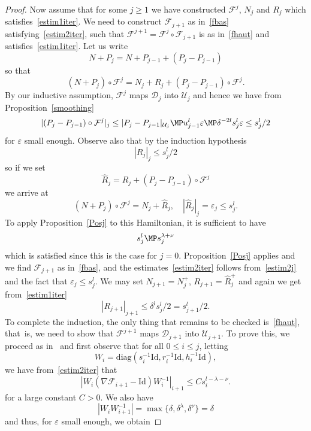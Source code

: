 \begin{proof}
Now assume that for some $j \geq 1$ we have constructed $\mathcal{F}^j$, $N_{j}$ and $R_{j}$ which satisfies~\eqref{estim1iter}. We need to construct $\mathcal{F}_{j+1}$ as in~\eqref{fbas} satisfying~\eqref{estim2iter}, such that $\mathcal{F}^{j+1}=\mathcal{F}^j \circ \mathcal{F}_{j+1}$ is as in~\eqref{fhaut} and satisfies~\eqref{estim1iter}. Let us write
\[ N+P_{j}=N+P_{j-1} +(P_{j} -P_{j-1}) \]
so that
\[ (N+P_{j})\circ \mathcal{F}^j=N_j+R_j+(P_{j} -P_{j-1}) \circ \mathcal{F}^j .\]
By our inductive assumption, $\mathcal{F}^j$ maps $\mathcal{D}_{j}$ into $\mathcal{U}_j$ and hence we have from Proposition~\ref{smoothing}
\[|(P_{j}-P_{j-1}) \circ\mathcal{F}^j|_{j} \leq |P_{j}-P_{j-1}|_{\mathcal{U}_j} \MP u_{j-1}^l\varepsilon \MP \delta^{-2l}s_j^l\varepsilon \leq s_j^l/2 \]
for $\varepsilon$ small enough. Observe also that by the induction hypothesis
\[ |R_{j}|_{j} \leq s_{j}^l/2 \]
so if we set
\[ \hat{R}_j=R_j+(P_{j} -P_{j-1}) \circ \mathcal{F}^j \]
we arrive at
\[ (N+P_{j})\circ \mathcal{F}^j=N_j+\hat{R}_j, \quad |\hat{R}_j|_{j}=\varepsilon_j \leq s_j^l. \]
To apply Proposition~\ref{Posj} to this Hamiltonian, it is sufficient to have
\begin{equation*}
s_j^l \MP s_j^{\lambda+\nu}
\end{equation*}
which is satisfied since this is the case for $j=0$. Proposition~\ref{Posj} applies and we find $\mathcal{F}_{j+1}$ as in~\eqref{fbas}, and the estimates~\eqref{estim2iter} follows from~\eqref{estim2j} and the fact that $\varepsilon_j\leq s_j^l$. We may set $N_{j+1}=N_j^+$, $R_{j+1}=\hat{R}_j^+$ and again we get from~\eqref{estim1iter}
\[ |R_{j+1}|_{j+1} \leq \delta^ls_j^l/2= s_{j+1}^l/2. \]
To complete the induction, the only thing that remains to be checked is~\eqref{fhaut}, that~is, we need to show that $\mathcal{F}^{j+1}$ maps $\mathcal{D}_{j+1}$ into $\mathcal{U}_{j+1}$. To prove this, we proceed as in~\cite{Pop04} and first observe that for all $0 \leq i \leq j$, letting
\[
W_i=\mathrm{diag}(s_i^{-1}\mathrm{Id},r_i^{-1}\mathrm{Id},h_i^{-1}\mathrm{Id}),
\]
we have from~\eqref{estim2iter} that
\begin{equation}\label{estweight1}
|W_i(\nabla \mathcal{F}_{i+1}-\mathrm{Id})W_i^{-1}|_{i+1} \leq C s_{i}^{l-\lambda-\nu}.
\end{equation}
for a large constant $C>0$. We also have
\begin{equation}\label{estweight2}
|W_i W_{i+1}^{-1}|=\max\{\delta,\delta^\lambda,\delta^\nu\}=\delta
\end{equation}
and thus, for $\varepsilon$ small enough, we obtain

\end{proof}
